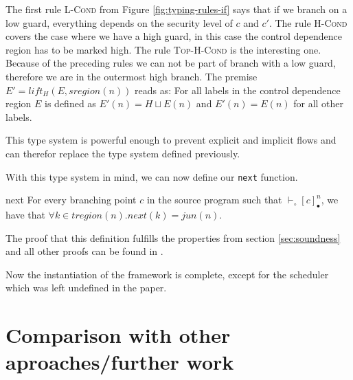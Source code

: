 \documentclass[a4paper,10pt]{llncs}
\begin{document}
The first rule \textsc{L-Cond} from Figure \ref{fig:typing-rules-if} says that if we branch on a low
guard, everything depends on the security level of $c$ and $c'$. The rule \textsc{H-Cond} covers the
case where we have a high guard, in this case the control dependence region has to be marked
high. The rule \textsc{Top-H-Cond} is the interesting one. Because of the preceding rules we can not
be part of branch with a low guard, therefore we are in the outermost high branch. The premise
$E' = lift_H(E, sregion(n))$ reads as: For all labels in the control dependence region $E$ is
defined as $E'(n) = H \sqcup E(n)$ and $E'(n) = E(n)$ for all other labels.

This type system is powerful enough to prevent explicit and implicit flows and can therefor
replace the type system defined previously. 

With this type system in mind, we can now define our \texttt{next} function.

\begin{definition}{next}
For every branching point $c$ in the source program such that $\vdash_\circ [c]_\bullet^n$, we  have
that $\forall k \in tregion(n) . next(k) = jun(n)$.
\end{definition}

The proof that this definition fulfills the properties from section \ref{sec:soundness} and all other
proofs can be found in \cite{Barthe09}.

Now the instantiation of the framework is complete, except for the scheduler which was left undefined
in the paper.

\section{Comparison with other aproaches/further work}
\label{sec:furtherwork}


\end{document}
